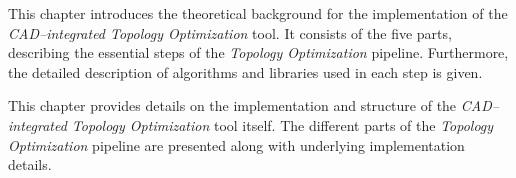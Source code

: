 \noindent This chapter introduces the theoretical background for the implementation of the \textit{CAD--integrated Topology Optimization} tool. It consists of the five parts, describing the essential steps of the \textit{Topology Optimization} pipeline. Furthermore, the detailed description of algorithms and libraries used in each step is given.
\\

  \vspace{1mm}

\noindent This chapter provides details on the implementation and structure of the \textit{CAD--integrated Topology Optimization} tool itself. The different parts of the \textit{Topology Optimization} pipeline are presented along with underlying implementation details.
\\